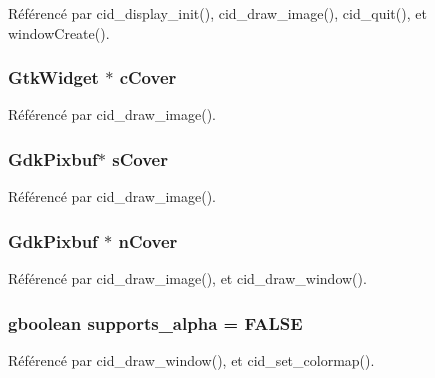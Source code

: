 Référencé par cid\_\-display\_\-init(), cid\_\-draw\_\-image(), cid\_\-quit(), et windowCreate().
\subsubsection{\setlength{\rightskip}{0pt plus 5cm}GtkWidget $\ast$ {\bf cCover}}\label{cid-gtk_8c_a8ebf70ccc1dd370f354c991f80a9213}




Référencé par cid\_\-draw\_\-image().
\subsubsection{\setlength{\rightskip}{0pt plus 5cm}GdkPixbuf$\ast$ {\bf sCover}}\label{cid-gtk_8c_07bf7b8c46be75fe9a66bdcdbfb9d3d7}




Référencé par cid\_\-draw\_\-image().
\subsubsection{\setlength{\rightskip}{0pt plus 5cm}GdkPixbuf $\ast$ {\bf nCover}}\label{cid-gtk_8c_f4c69f864431f7ffe8bdf3215a743608}




Référencé par cid\_\-draw\_\-image(), et cid\_\-draw\_\-window().
\subsubsection{\setlength{\rightskip}{0pt plus 5cm}gboolean {\bf supports\_\-alpha} = FALSE}\label{cid-gtk_8c_9ce0ebdeaa69f3de5f586c6428c5388c}




Référencé par cid\_\-draw\_\-window(), et cid\_\-set\_\-colormap().
